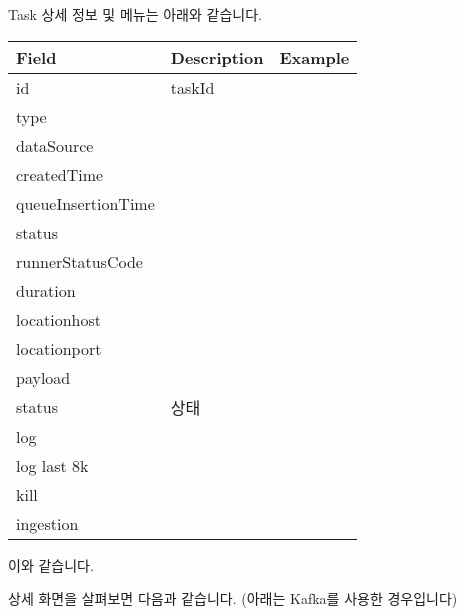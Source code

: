 \documentclass[letterpaper,10pt,english]{sphinxmanual}
\begin{document}
Task 상세 정보 및 메뉴는 아래와 같습니다.


\begin{savenotes}\sphinxattablestart
\centering
\begin{tabulary}{\linewidth}[t]{|T|T|T|}
\hline
\sphinxstyletheadfamily 
Field
&\sphinxstyletheadfamily 
Description
&\sphinxstyletheadfamily 
Example
\\
\hline
id
&
taskId
&\\
\hline
type
&&\\
\hline
dataSource
&&\\
\hline
createdTime
&&\\
\hline
queueInsertionTime
&&\\
\hline
status
&&\\
\hline
runnerStatusCode
&&\\
\hline
duration
&&\\
\hline
locationhost
&&\\
\hline
locationport
&&\\
\hline
payload
&&\\
\hline
status
&
상태
&\\
\hline
log
&&\\
\hline
log last 8k
&&\\
\hline
kill
&&\\
\hline
ingestion
&&\\
\hline
\end{tabulary}
\par
\sphinxattableend\end{savenotes}

이와 같습니다.
\begin{quote}

\begin{figure}[H]
\centering

\noindent{}
\end{figure}
\end{quote}

상세 화면을 살펴보면 다음과 같습니다. (아래는 Kafka를 사용한 경우입니다)
\begin{quote}

\begin{figure}[H]
\centering

\noindent{}
\end{figure}

\begin{figure}[H]
\centering

\noindent{}
\end{figure}
\end{quote}
\end{document}
